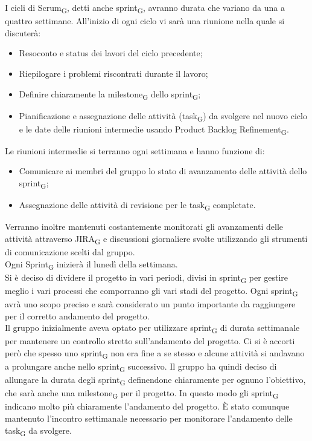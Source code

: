I cicli di Scrum\textsubscript{G}, detti anche sprint\textsubscript{G}, avranno durata che variano da una a quattro settimane. All'inizio di ogni ciclo vi sarà una riunione nella quale si discuterà:
\begin{itemize}
	\item Resoconto e status dei lavori del ciclo precedente;
	\item Riepilogare i problemi riscontrati durante il lavoro;
	\item Definire chiaramente la milestone\textsubscript{G} dello sprint\textsubscript{G};
	\item Pianificazione e assegnazione delle attività (task\textsubscript{G}) da svolgere nel nuovo ciclo e le date delle riunioni intermedie usando Product Backlog Refinement\textsubscript{G}.
\end{itemize}
Le riunioni intermedie si terranno ogni settimana e hanno funzione di:
\begin{itemize}
	\item Comunicare ai membri del gruppo lo stato di avanzamento delle attività dello sprint\textsubscript{G};
	\item Assegnazione delle attività di revisione per le task\textsubscript{G} completate.
\end{itemize}
Verranno inoltre mantenuti costantemente monitorati gli avanzamenti delle attività attraverso JIRA\textsubscript{G} e discussioni giornaliere svolte utilizzando gli strumenti di comunicazione scelti dal gruppo.\\
Ogni Sprint\textsubscript{G} inizierà il lunedì della settimana.\\
Si è deciso di dividere il progetto in vari periodi, divisi in sprint\textsubscript{G} per gestire meglio i vari processi che comporranno gli vari stadi del progetto. Ogni sprint\textsubscript{G} avrà uno scopo preciso e sarà considerato un punto importante da raggiungere per il corretto andamento del progetto.\\
Il gruppo inizialmente aveva optato per utilizzare sprint\textsubscript{G} di durata settimanale per mantenere un controllo stretto sull'andamento del progetto. Ci si è accorti però che spesso uno sprint\textsubscript{G} non era fine a se stesso e alcune attività si andavano a prolungare anche nello sprint\textsubscript{G} successivo. Il gruppo ha quindi deciso di allungare la durata degli sprint\textsubscript{G}  definendone chiaramente per ognuno l'obiettivo, che sarà anche una milestone\textsubscript{G} per il progetto. In questo modo gli sprint\textsubscript{G} indicano molto più chiaramente l'andamento del progetto. È stato comunque mantenuto l'incontro settimanale necessario per monitorare l'andamento delle task\textsubscript{G} da svolgere.
\newpage
